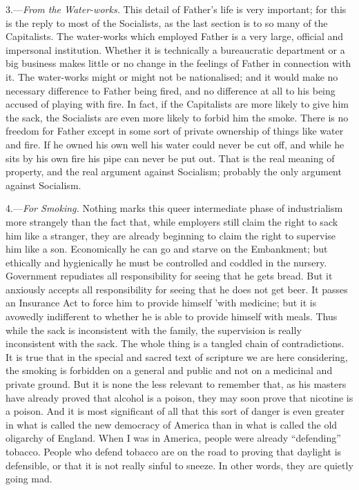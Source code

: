 \documentclass{book}
\begin{document}
3.—\emph{From the Water-works.} This detail of Father’s life is very important; for this is the reply to most of the Socialists, as the last section is to so many of the Capitalists. The water-works which employed Father is a very large, official and impersonal institution. Whether it is technically a bureaucratic department or a big business makes little or no change in the feelings of Father in connection with it. The water-works might or might not be nationalised; and it would make no necessary difference to Father being fired, and no difference at all to his being accused of playing with fire. In fact, if the Capitalists are more likely to give him the sack, the Socialists are even more likely to forbid him the smoke. There is no freedom for Father except in some sort of private ownership of things like water and fire. If he owned his own well his water could never be cut off, and while he sits by his own fire his pipe can never be put out. That is the real meaning of property, and the real argument against Socialism; probably the only argument against Socialism.

4.—\emph{For Smoking.} Nothing marks this queer intermediate phase of industrialism more strangely than the fact that, while employers still claim the right to sack him like a stranger, they are already beginning to claim the right to supervise him like a son. Economically he can go and starve on the Embankment; but ethically and hygienically he must be controlled and coddled in the nursery. Government repudiates all responsibility for seeing that he gets bread. But it anxiously accepts all responsibility for seeing that he does not get beer. It passes an Insurance Act to force him to provide himself ’with medicine; but it is avowedly indifferent to whether he is able to provide himself with meals. Thus while the sack is inconsistent with the family, the supervision is really inconsistent with the sack. The whole thing is a tangled chain of contradictions. It is true that in the special and sacred text of scripture we are here considering, the smoking is forbidden on a general and public and not on a medicinal and private ground. But it is none the less relevant to remember that, as his masters have already proved that alcohol is a poison, they may soon prove that nicotine is a poison. And it is most significant of all that this sort of danger is even greater in what is called the new democracy of America than in what is called the old oligarchy of England. When I was in America, people were already “defending” tobacco. People who defend tobacco are on the road to proving that daylight is defensible, or that it is not really sinful to sneeze. In other words, they are quietly going mad.
\end{document}
